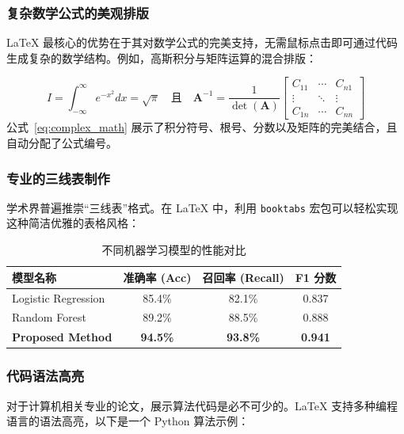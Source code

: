 \documentclass[UTF8,AutoFakeBold=1,AutoFakeSlant,zihao=-4]{SCAU}
\begin{document}
\subsubsection{复杂数学公式的美观排版}
LaTeX 最核心的优势在于其对数学公式的完美支持，无需鼠标点击即可通过代码生成复杂的数学结构。例如，高斯积分与矩阵运算的混合排版：

\begin{equation}
    I = \int_{-\infty}^{\infty} e^{-x^2} dx = \sqrt{\pi} \quad \text{且} \quad 
    \mathbf{A}^{-1} = \frac{1}{\det(\mathbf{A})} \begin{bmatrix}
    C_{11} & \cdots & C_{n1} \\
    \vdots & \ddots & \vdots \\
    C_{1n} & \cdots & C_{nn}
    \end{bmatrix}
    \label{eq:complex_math}
\end{equation}
公式~\eqref{eq:complex_math} 展示了积分符号、根号、分数以及矩阵的完美结合，且自动分配了公式编号。

\subsubsection{专业的三线表制作}
学术界普遍推崇“三线表”格式。在 LaTeX 中，利用 \texttt{booktabs} 宏包可以轻松实现这种简洁优雅的表格风格：

\begin{table}[htbp]
    \centering
    \caption{不同机器学习模型的性能对比}
    \label{tab:ml_performance}
    \begin{tabular}{lccc}
        \toprule
        \textbf{模型名称} & \textbf{准确率 (Acc)} & \textbf{召回率 (Recall)} & \textbf{F1 分数} \\
        \midrule
        Logistic Regression & 85.4\% & 82.1\% & 0.837 \\
        Random Forest       & 89.2\% & 88.5\% & 0.888 \\
        \textbf{Proposed Method} & \textbf{94.5\%} & \textbf{93.8\%} & \textbf{0.941} \\
        \bottomrule
    \end{tabular}
\end{table}

\subsubsection{代码语法高亮}
对于计算机相关专业的论文，展示算法代码是必不可少的。LaTeX 支持多种编程语言的语法高亮，以下是一个 Python 算法示例：
\end{document}
